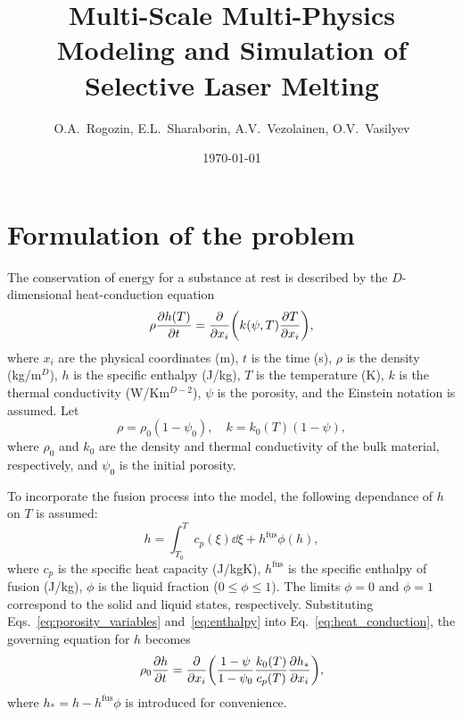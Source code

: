 \documentclass{article}
\title{Multi-Scale Multi-Physics Modeling and Simulation of Selective Laser Melting}
\date{\today}
\author{O.A.~Rogozin, E.L.~Sharaborin, A.V.~Vezolainen, O.V.~Vasilyev}
\newcommand{\fusion}[1]{{#1}^\mathrm{fus}}
\begin{document}
\maketitle
\tableofcontents

\section{Formulation of the problem}

The conservation of energy for a substance at rest is described by the \(D\)-dimensional heat-conduction equation
\begin{equation}\label{eq:heat_conduction}
	\rho\pdv{h(T)}{t} = \pdv{x_i}\qty( k(\psi,T)\pdv{T}{x_i} ),
\end{equation}
where \(x_i\) are the physical coordinates (\si{m}), \(t\) is the time (\si{s}),
\(\rho\) is the density (\si{kg/m}\(^D\)), \(h\) is the specific enthalpy (\si{J/kg}),
\(T\) is the temperature (\si{\K}), \(k\) is the thermal conductivity (\si{W/Km}\(^{D-2}\)),
\(\psi\) is the porosity, and the Einstein notation is assumed. Let
\begin{equation}\label{eq:porosity_variables}
	\rho = \rho_0(1-\psi_0), \quad k = k_0(T)(1-\psi),
\end{equation}
where \(\rho_0\) and \(k_0\) are the density and thermal conductivity of the bulk material, respectively,
and \(\psi_0\) is the initial porosity.

To incorporate the fusion process into the model, the following dependance of \(h\) on \(T\) is assumed:
\begin{equation}\label{eq:enthalpy}
	h = \int_{T_0}^T c_p(\xi)\dd{\xi} + \fusion{h}\phi(h),
\end{equation}
where \(c_p\) is the specific heat capacity (\si{J/kgK}), \(\fusion{h}\) is the specific enthalpy of fusion (\si{J/kg}),
\(\phi\) is the liquid fraction (\(0 \leq \phi \leq 1\)).
The limits \(\phi=0\) and \(\phi=1\) correspond to the solid and liquid states, respectively.
Substituting Eqs.~\eqref{eq:porosity_variables} and~\eqref{eq:enthalpy} into Eq.~\eqref{eq:heat_conduction},
the governing equation for \(h\) becomes
\begin{equation}\label{eq:heat_conduction2}
	\rho_0\pdv{h}{t} = \pdv{x_i}\qty( \frac{1-\psi}{1-\psi_0} \frac{k_0(T)}{c_p(T)}\pdv{h_*}{x_i} ),
\end{equation}
where \(h_* = h - \fusion{h}\phi\) is introduced for convenience.
\end{document}
